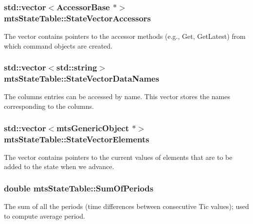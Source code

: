 \subsubsection[{State\+Vector\+Accessors}]{\setlength{\rightskip}{0pt plus 5cm}std\+::vector$<${\bf Accessor\+Base} $\ast$$>$ mts\+State\+Table\+::\+State\+Vector\+Accessors\hspace{0.3cm}{\ttfamily [protected]}}\label{classmts_state_table_a5eb62dbdd241d316b7a18ef22f68ae91}
The vector contains pointers to the accessor methods (e.\+g., Get, Get\+Latest) from which command objects are created. \hypertarget{classmts_state_table_ad7b3a968771bc125b3865a4547ec92fe}{}
\subsubsection[{State\+Vector\+Data\+Names}]{\setlength{\rightskip}{0pt plus 5cm}std\+::vector$<$std\+::string$>$ mts\+State\+Table\+::\+State\+Vector\+Data\+Names\hspace{0.3cm}{\ttfamily [protected]}}\label{classmts_state_table_ad7b3a968771bc125b3865a4547ec92fe}
The columns entries can be accessed by name. This vector stores the names corresponding to the columns. \hypertarget{classmts_state_table_a9752b943b66ae808210cff3fde497be3}{}
\subsubsection[{State\+Vector\+Elements}]{\setlength{\rightskip}{0pt plus 5cm}std\+::vector$<${\bf mts\+Generic\+Object} $\ast$$>$ mts\+State\+Table\+::\+State\+Vector\+Elements\hspace{0.3cm}{\ttfamily [protected]}}\label{classmts_state_table_a9752b943b66ae808210cff3fde497be3}
The vector contains pointers to the current values of elements that are to be added to the state when we advance. \hypertarget{classmts_state_table_a57adbe08f57772500f8066c64ad5b49b}{}
\subsubsection[{Sum\+Of\+Periods}]{\setlength{\rightskip}{0pt plus 5cm}double mts\+State\+Table\+::\+Sum\+Of\+Periods\hspace{0.3cm}{\ttfamily [protected]}}\label{classmts_state_table_a57adbe08f57772500f8066c64ad5b49b}
The sum of all the periods (time differences between consecutive Tic values); used to compute average period. \hypertarget{classmts_state_table_ae4b2244609f4ec292d183d1daeeaf994}{}
